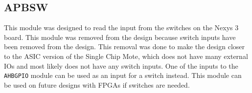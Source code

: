 \subsection{APBSW}
This module was designed to read the input from the switches on the Nexys 3 board. This module was removed from the design because switch inputs have been removed from the design. This removal was done to make the design closer to the ASIC version of the Single Chip Mote, which does not have many external IOs and most likely does not have any switch inputs. One of the inputs to the \texttt{AHBGPIO} module can be used as an input for a switch instead. This module can be used on future designs with FPGAs if switches are needed.

